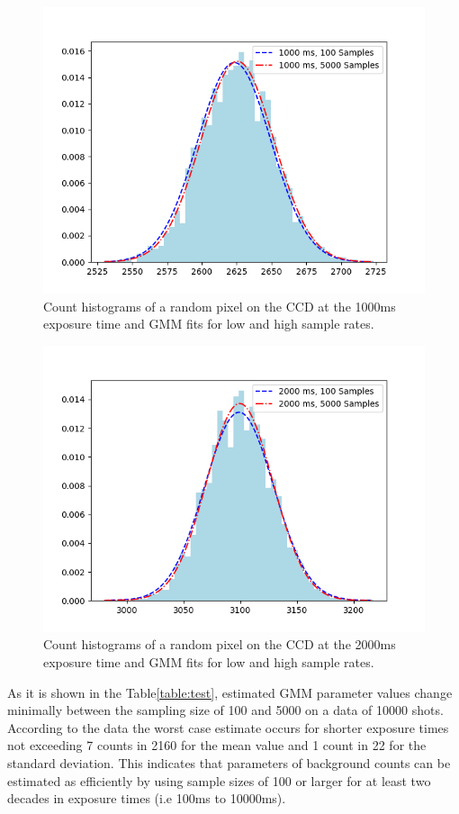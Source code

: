 \begin{figure}[H]
	\centering
	\includegraphics[angle=0,origin=c,width = 0.8\linewidth]{Section_ODMR/Figures/Pixel2550_1000msFits.png}
	\caption{Count histograms of a random pixel on the CCD at the 1000ms exposure time and GMM fits for low and high
		sample rates.}
	\label{fig:BGofRandomPixelasIntTimesFits1000ms}
\end{figure}

\begin{figure}[H]
	\centering
	\includegraphics[angle=0,origin=c,width = 0.8\linewidth]{Section_ODMR/Figures/Pixel2550_2000msFits.png}
	\caption{Count histograms of a random pixel on the CCD at the 2000ms exposure time and GMM fits for low and high
		sample rates.}
	\label{fig:BGofRandomPixelasIntTimesFits2000ms}
\end{figure}

As it is shown in the Table\ref{table:test}, estimated GMM parameter 
values change minimally between the sampling size of 100  and 5000 on a
data of 10000 shots. According to the data the worst case estimate occurs
for shorter exposure times not exceeding 7 counts in 2160 for the mean 
value and 1 count in 22 for the standard deviation. This indicates that 
parameters of background counts can be estimated as efficiently by using 
sample sizes of 100 or larger for at least two decades in exposure times
(i.e 100ms to 10000ms).


